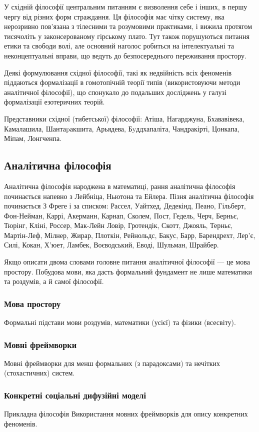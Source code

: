 У східній філософії центральним питанням є визволення себе
і інших, в першу чергу від різних форм страждання. Ця філософія
має чітку систему, яка нерозривно пов'язана з тілесними та
розумовими практиками, і вижила протягом тисячоліть у
законсерованому гірському плато. Тут також порушуються
питання етики та свободи волі, але основний наголос робиться
на інтелектуальні та неконцептуальні вправи, що ведуть до
безпосереднього переживання простору.

Деякі формулювання східної філософії, такі як недвійність
всіх феноменів піддаються формалізації в гомотопічній
теорії типів (використовуючи методи аналітичної філософії),
що спонукало до подальших досліджень у галузі формалізації
езотеричних теорій.

Представники східної (тибетської) філософії: Атіша, Нагарджуна,
Бхававівека, Камалашила, Шантаpакшита, Арьядева, Бyддхапаліта,
Чандракірті, Цонкапа, Міпам, Лонгченпа.

\subsection{Аналітична філософія}

Аналітична філософія народжена в математиці, рання аналітична
філософія починається напевно з Лейбніца, Ньютона та Ейлера.
Пізня аналітична філософія починається З Фреге і за списком:
Рассел, Уайтхед, Дедекінд, Пеано, Гільберт, Фон-Нейман, Каррі,
Акерманн, Карнап, Сколем, Пост, Гедель, Черч, Берньє, Тюрінг,
Кліні, Россер, Мак-Лейн Ловір, Гротендік, Скотт, Джояль,
Терньє, Мартін-Леф, Мілнер, Жирар, Плоткін, Рейнольдс,
Бакус, Барр, Барендрехт, Лер'є, Силі, Кокан, Х'юет, Ламбек,
Воєводський, Еводі, Шульман, Шрайбер.

Якщо описати двома словами головне питання аналітичної
філософії --- це мова простору. Побудова мови, яка дасть
формальний фундамент не лише математики та роздумів, а й самої філософії.

\subsubsection{Мова простору}

Формальні підстави мови роздумів, математики (усієї) та фізики (всесвіту).

\subsubsection{Мовні фреймворки}

Мовні фреймворки для менш формальних (з парадоксами) та нечітких (стохастичних) систем.

\subsubsection{Конкретні соціальні дифузійні моделі}

Прикладна філософія Використання мовних фреймворків для опису конкретних феноменів.

\normalsize
